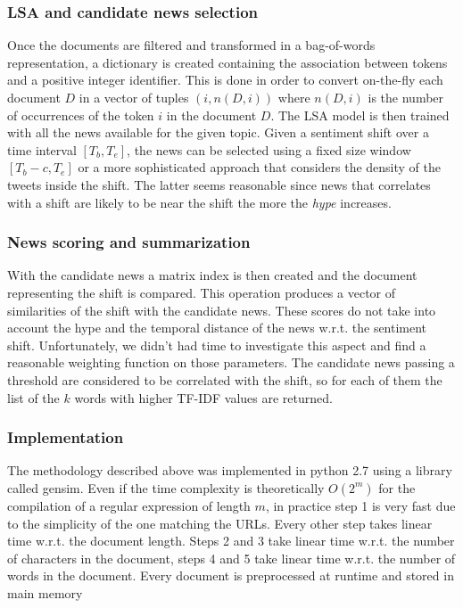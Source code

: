 \subsubsection*{LSA and candidate news selection}
Once the documents are filtered and transformed in a bag-of-words representation, a dictionary is created containing the association between tokens and a positive integer identifier. This is done in order to convert on-the-fly each document $D$ in a vector of tuples $(i,n(D,i))$ where $n(D,i)$ is the number of occurrences of the token $i$ in the document $D$. The LSA model is then trained with all the news available for the given topic. Given a sentiment shift over a time interval $[T_b,T_e]$, the news can be selected using a fixed size window $[T_b - c,T_e]$ or a more sophisticated approach that considers the density of the tweets inside the shift. The latter seems reasonable since news that correlates with a shift are likely to be near the shift the more the \emph{hype} increases.

\subsubsection*{News scoring and summarization}
With the candidate news a matrix index is then created and the document representing the shift is compared. This operation produces a vector of similarities of the shift with the candidate news. These scores do not take into account the hype and the temporal distance of the news w.r.t. the sentiment shift. Unfortunately, we didn't had time to investigate this aspect and find a reasonable weighting function on those parameters. The candidate news passing a threshold are considered to be correlated with the shift, so for each of them the list of the $k$ words with higher TF-IDF values are returned.

\subsubsection*{Implementation}
The methodology described above was implemented in python 2.7 using a library called gensim\cite{Gensim}.
Even if the time complexity is theoretically $O(2^m)$ for the compilation of a regular expression of length $m$, in practice step 1 is very fast due to the simplicity of the one matching the URLs. Every other step takes linear time w.r.t. the document length. Steps 2 and 3 take linear time w.r.t. the number of characters in the document, steps 4 and 5 take linear time w.r.t. the number of words in the document. Every document is preprocessed at runtime and stored in main memory